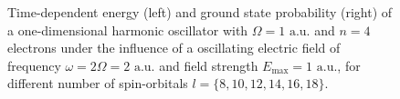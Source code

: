 \begin{figure}[h]
    \centering
    \caption{Time-dependent energy (left) and ground state probability (right)
        of a one-dimensional harmonic oscillator with $\Omega=1 \text{ a.u.}$
        and $n=4$ electrons under the influence of a oscillating electric field 
        of frequency $\omega = 2 \Omega = 2 \text{ a.u.}$ and field strength
        $E_\text{max}=1 \text{ a.u.}$,
        for different number of spin-orbitals $l=\{8,10,12,14,16,18\}$.
    }
    \label{fig:1d_n4_qd}
\end{figure}

